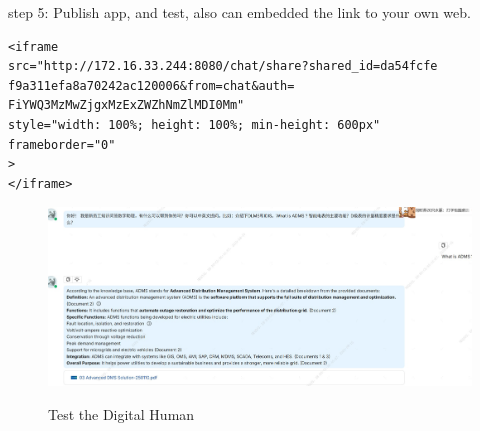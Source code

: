 step 5: Publish app, and test, also can embedded the link to your own web.

\begin{verbatim}
<iframe
src="http://172.16.33.244:8080/chat/share?shared_id=da54fcfe
f9a311efa8a70242ac120006&from=chat&auth=
FiYWQ3MzMwZjgxMzExZWZhNmZlMDI0Mm"
style="width: 100%; height: 100%; min-height: 600px"
frameborder="0"
>
</iframe>
\end{verbatim}

\begin{figure}[H]
    \begin{center}
        \includegraphics[width=.95\linewidth]{res/ragflow_qa.jpg}\\
        \caption{Test the Digital Human }\label{ragflow_qa}
    \end{center}
\end{figure}

